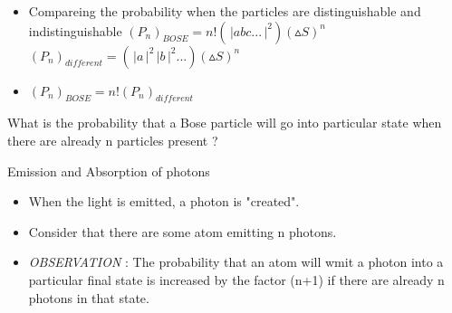 \documentclass[aspectratio=169]{beamer}
\begin{document}
\begin{frame}

	\begin{itemize}
	
	\item Compareing the probability when the particles are distinguishable and indistinguishable \newline
	$(P_{n})_{BOSE} = n!\left(\,\Bigr\rvert abc... \,\Bigr\rvert^{2}\right)(\vartriangle S)^{n}$ \newline
	$(P_{n})_{different} = \left(\,\Bigr\rvert a \,\Bigr\rvert^{2}\,\Bigr\rvert b \,\Bigr\rvert^{2}...\right)(\vartriangle S)^{n}$ 
	\item $(P_{n})_{BOSE} = n!(P_{n})_{different}$
	
	\end{itemize}
	
\end{frame}

\begin{frame}

	
	{\large	What is the probability that a Bose particle will go into particular state when there are already n particles present ?}
		
\end{frame}

\begin{frame}{Emission and Absorption of photons}

	\begin{itemize}
	
		\item When the light is emitted, a photon is "created".\newline
		\item Consider that there are some atom emitting n photons. \newline
		\item \textit{OBSERVATION} : The probability that an atom will wmit a photon into a particular final state is increased by the factor (n+1) if there are already n photons in that state.
		
	\end{itemize}
	
\end{frame}
\end{document}
